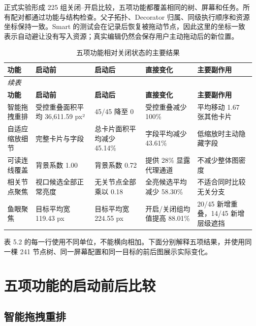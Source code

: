 \documentclass[11pt,a4paper,oneside,extrafontsizes]{memoir}
\begin{document}
正式实验形成 225 组关闭–开启比较，五项功能都覆盖相同的树、屏幕和任务。所有配对都通过功能与结构检查。父子拓扑、Decorator 归属、同级执行顺序和资源坐标保持一致。Smart 的测试会在记录后恢复被拖动节点，因此这里的坐标一致表示自动避让没有写入资源；真实编辑仍然会保存用户主动拖动后的新位置。

\begin{center}
\small
\begin{longtable}{@{}p{} p{} p{} p{} p{}@{}}
\caption{五项功能相对关闭状态的主要结果}\label{tab:auto-7}\\
\toprule
\textbf{功能} & \textbf{启动前} & \textbf{启动后} & \textbf{直接变化} & \textbf{主要副作用} \\
\midrule
\endfirsthead
\multicolumn{5}{l}{\small\itshape 续表}\\
\toprule
\textbf{功能} & \textbf{启动前} & \textbf{启动后} & \textbf{直接变化} & \textbf{主要副作用} \\
\midrule
\endhead
智能拖拽重排 & 受控重叠面积平均 36,611.59 px² & 45/45 降至 0 & 受控重叠减少 100\% & 平均移动 1.67 张其他卡片 \\
自适应缩放细节 & 完整卡片与字段 & 总卡片面积平均减少 45.14\% & 字段平均减少 43.61\% & 低缩放时主动隐藏字段 \\
可读连线覆盖 & 背景系数 1.00 & 背景系数 0.72 & 提供 28\% 显露代理通道 & 不减少整体图密度 \\
相关节点聚焦 & 视口候选全部正常亮度 & 无关节点全部乘以 0.18 & 全亮候选平均减少 58.30\% & 不适合同时比较无关分支 \\
鱼眼聚焦 & 目标平均宽 119.43 px & 目标平均宽 224.55 px & 开启/关闭组均值提高 88.01\% & 20/45 新增重叠，14/45 新增层级遮挡 \\
\bottomrule
\end{longtable}
\end{center}

表 5.2 的每一行使用不同单位，不能横向相加。下面分别解释五项结果，并使用同一棵 241 节点树、同一屏幕配置和同一目标的前后图展示实际变化。

\section{五项功能的启动前后比较}

\subsection{智能拖拽重排}
\end{document}
